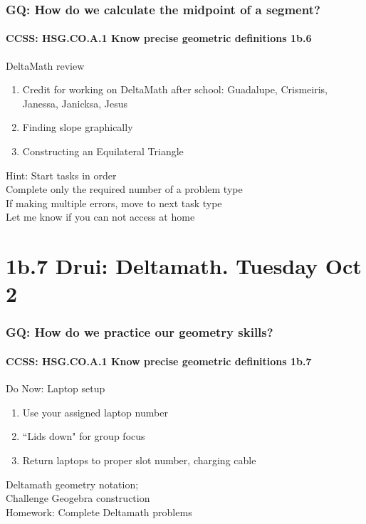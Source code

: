 \documentclass{beamer}
\begin{document}
  \frame
    {
      \frametitle{GQ: How do we calculate the midpoint of a segment?}
      \framesubtitle{CCSS: HSG.CO.A.1 Know precise geometric definitions  \alert{1b.6}}

      \begin{block}{DeltaMath review}
        \begin{enumerate}
            \item Credit for working on DeltaMath after school: Guadalupe, Crismeiris, Janessa, Janicksa, Jesus
            \item Finding slope graphically
            \item Constructing an Equilateral Triangle
        \end{enumerate}
      \end{block}
      Hint: Start tasks in order\\
      Complete only the required number of a problem type\\
      If making multiple errors, move to next task type\\
      \vspace{0.5cm}
      Let me know if you can not access at home
    }

\section{1b.7 Drui: Deltamath. Tuesday Oct 2}
  \frame
  {
    \frametitle{GQ: How do we practice our geometry skills?}
    \framesubtitle{CCSS: HSG.CO.A.1 Know precise geometric definitions  \alert{1b.7}}

    \begin{block}{Do Now: Laptop setup}
    \begin{enumerate}
        \item Use your assigned laptop number
        \item ``Lids down" for group focus
        \item Return laptops to proper slot number, charging cable
    \end{enumerate}
    \end{block}
    Deltamath geometry notation; \\Challenge Geogebra construction\\
    \vspace{1cm}
    Homework: Complete Deltamath problems
  }
\end{document}

